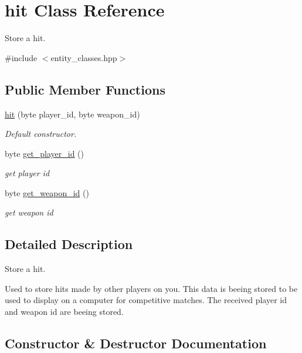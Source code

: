 \hypertarget{classhit}{}\section{hit Class Reference}
\label{classhit}


Store a hit.  




{\ttfamily \#include $<$entity\+\_\+classes.\+hpp$>$}

\subsection*{Public Member Functions}
\begin{DoxyCompactItemize}
\item 
\hyperlink{classhit_a28033534baf49ea09fecf630e0bc9eb5}{hit} (byte player\+\_\+id, byte weapon\+\_\+id)
\begin{DoxyCompactList}\small\item\em Default constructor. \end{DoxyCompactList}\item 
byte \hyperlink{classhit_a914b4442560954de4de27f85f6168919}{get\+\_\+player\+\_\+id} ()
\begin{DoxyCompactList}\small\item\em get player id \end{DoxyCompactList}\item 
byte \hyperlink{classhit_afba4878708b2c56bddf39cfb90c1a4d9}{get\+\_\+weapon\+\_\+id} ()
\begin{DoxyCompactList}\small\item\em get weapon id \end{DoxyCompactList}\end{DoxyCompactItemize}


\subsection{Detailed Description}
Store a hit. 

Used to store hits made by other players on you. This data is beeing stored to be used to display on a computer for competitive matches. The received player id and weapon id are beeing stored. 

\subsection{Constructor \& Destructor Documentation}
\hypertarget{classhit_a28033534baf49ea09fecf630e0bc9eb5}{}\label{classhit_a28033534baf49ea09fecf630e0bc9eb5} 
